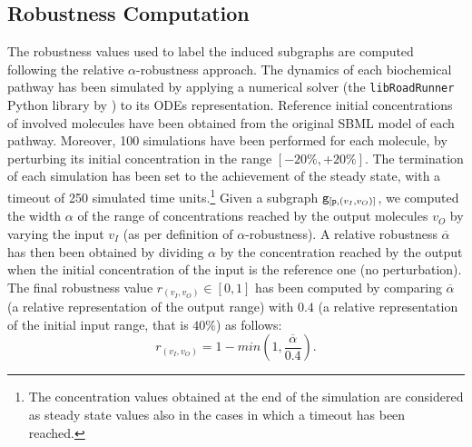 \subsection{Robustness Computation}\label{sec:robustness-computation}
The robustness values used to label the induced subgraphs are computed following the relative $\alpha$-robustness approach. The dynamics of each biochemical pathway has been simulated by applying a numerical solver (the \texttt{libRoadRunner} Python library by \citet{somogyi2015libroadrunner}) to its ODEs representation. Reference initial concentrations of involved molecules have been obtained from the original SBML model of each pathway. Moreover, 100 simulations have been performed for each molecule, by perturbing its initial concentration in the range $[-20\%,+20\%]$. The termination of each simulation has been set to the achievement of the steady state, with a timeout of 250 simulated time units.\footnote{The concentration values obtained at the end of the simulation are considered as steady state values also in the cases in which a timeout has been reached.} Given a subgraph $\mathtt{g}_{[\mathtt{p}, (v_I,v_O)]}$, we computed the width $\alpha$ of the range of concentrations reached by the output molecules $v_O$ by varying the input $v_I$ (as per definition of $\alpha$-robustness). A relative robustness $\overline{\alpha}$ has then been obtained by dividing $\alpha$ by the concentration reached by the output when the initial concentration of the input is the reference one (no perturbation). The final robustness value $r_{(v_I,v_O)} \in [0,1]$ has been computed by comparing $\overline{\alpha}$ (a relative representation of the output range) with $0.4$ (a relative representation of the initial input range, that is $40\%$) as follows:
\[
    r_{(v_I,v_O)} = 1 - min (1,\frac{\overline{\alpha}}{0.4}).
\]

